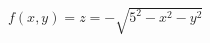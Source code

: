 \documentclass[preview]{standalone}
\begin{document}
\begin{center}
$f(x,y)=z=-\sqrt{5^2-x^2-y^2}$
\end{center}
\end{document}
